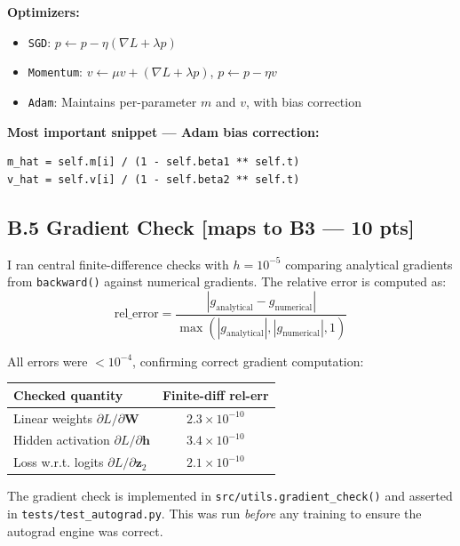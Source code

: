 \documentclass[11pt,a4paper]{article}
\begin{document}
\textbf{Optimizers:}
\begin{itemize}
    \item \texttt{SGD}: $p \leftarrow p - \eta(\nabla L + \lambda p)$
    \item \texttt{Momentum}: $v \leftarrow \mu v + (\nabla L + \lambda p)$, $p \leftarrow p - \eta v$
    \item \texttt{Adam}: Maintains per-parameter $m$ and $v$, with bias correction
\end{itemize}

\textbf{Most important snippet — Adam bias correction:}
\begin{verbatim}
m_hat = self.m[i] / (1 - self.beta1 ** self.t)
v_hat = self.v[i] / (1 - self.beta2 ** self.t)
\end{verbatim}

\subsection*{B.5 Gradient Check \hfill [maps to B3 --- 10 pts]}

I ran central finite-difference checks with $h = 10^{-5}$ comparing analytical gradients from \texttt{backward()} against numerical gradients. The relative error is computed as:
\[
\text{rel\_error} = \frac{|g_{\text{analytical}} - g_{\text{numerical}}|}{\max(|g_{\text{analytical}}|, |g_{\text{numerical}}|, 1)}
\]

All errors were $< 10^{-4}$, confirming correct gradient computation:

\begin{center}
\begin{tabularx}{0.9\textwidth}{@{}X c@{}}
\toprule
\textbf{Checked quantity} & \textbf{Finite-diff rel-err} \\
\midrule
Linear weights $\partial L/\partial\mathbf{W}$ & $2.3 \times 10^{-10}$ \\
Hidden activation $\partial L/\partial\mathbf{h}$ & $3.4 \times 10^{-10}$ \\
Loss w.r.t. logits $\partial L/\partial\mathbf{z}_2$ & $2.1 \times 10^{-10}$ \\
\bottomrule
\end{tabularx}
\end{center}

The gradient check is implemented in \texttt{src/utils.gradient\_check()} and asserted in \texttt{tests/test\_autograd.py}. This was run \emph{before} any training to ensure the autograd engine was correct.
\end{document}
